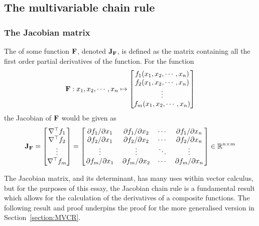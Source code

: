 \subsection{The multivariable chain rule}
\subsubsection{The Jacobian matrix}
\begin{defn}
    The  of some function $\mathbf{F}$, denoted $\mathbf{J}_{\mathbf{F}}$, is defined as the matrix containing all the first order partial derivatives
    of the function. For the function
    $$\mathbf{F}:x_1,x_2,\cdots,x_n\mapsto\begin{bmatrix}
        f_1(x_1,x_2,\cdots,x_n)\\
        f_2(x_1,x_2,\cdots,x_n)\\
        \vdots\\
        f_m(x_1,x_2,\cdots,x_n)
    \end{bmatrix}$$
    the Jacobian of $\mathbf{F}$ would be given as
    $$
        \mathbf{J}_{\mathbf{F}}=\begin{bmatrix}
            \nabla^\top f_1\\
            \nabla^\top f_2\\
            \vdots\\
            \nabla^\top f_m
        \end{bmatrix}=\begin{bmatrix}
            \pdv*{f_1}{x_1} & \pdv*{f_1}{x_2} & \cdots & \pdv*{f_1}{x_n}\\
            \pdv*{f_2}{x_1} & \pdv*{f_2}{x_2} & \cdots & \pdv*{f_2}{x_n}\\
            \vdots & \vdots & \ddots & \vdots \\
            \pdv*{f_m}{x_1} & \pdv*{f_m}{x_2} & \cdots & \pdv*{f_m}{x_n}\\
        \end{bmatrix}\in\mathbb{R}^{n\times m}
    $$
\end{defn}
The Jacobian matrix, and its determinant, has many uses within vector calculus, but for the purposes of this essay, the Jacobian chain rule is a fundamental result which allows for the calculation of the derivatives of a composite functions. The following result and proof underpins the proof for the more generalised version in Section~\ref{section:MVCR}.
